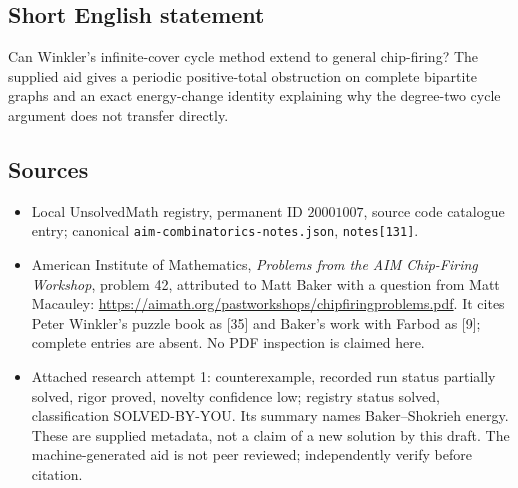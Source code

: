 \documentclass[11pt]{article}
\begin{document}
\subsection{Short English statement}
Can Winkler's infinite-cover cycle method extend to general chip-firing? The supplied aid gives a periodic positive-total obstruction on complete bipartite graphs and an exact energy-change identity explaining why the degree-two cycle argument does not transfer directly.
\subsection{Sources}
\begin{itemize}
\item Local UnsolvedMath registry, permanent ID $20001007$, source code catalogue entry; canonical \texttt{aim-combinatorics-notes.json}, \texttt{notes[131]}.
\item American Institute of Mathematics, \emph{Problems from the AIM Chip-Firing Workshop}, problem 42, attributed to Matt Baker with a question from Matt Macauley: \url{https://aimath.org/pastworkshops/chipfiringproblems.pdf}. It cites Peter Winkler's puzzle book as [35] and Baker's work with Farbod as [9]; complete entries are absent. No PDF inspection is claimed here.
\item Attached research attempt 1: counterexample, recorded run status partially solved, rigor proved, novelty confidence low; registry status solved, classification SOLVED-BY-YOU. Its summary names Baker--Shokrieh energy. These are supplied metadata, not a claim of a new solution by this draft. The machine-generated aid is not peer reviewed; independently verify before citation.
\end{itemize}
\end{document}
